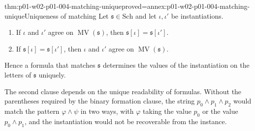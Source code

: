 \begin{hbtheorem}{thm:p01-w02-p01-004-matching-unique}{proved=annex:p01-w02-p01-004-matching-unique}{Uniqueness of matching}
Let \(\mathfrak s\in\mathrm{Sch}\) and let \(\iota,\iota'\) be
instantiations.
\begin{enumerate}
  \item If \(\iota\) and \(\iota'\) agree on \(\operatorname{MV}(\mathfrak
        s)\), then \(\mathfrak s[\iota]=\mathfrak s[\iota']\).
  \item If \(\mathfrak s[\iota]=\mathfrak s[\iota']\), then \(\iota\) and
        \(\iota'\) agree on \(\operatorname{MV}(\mathfrak s)\).
\end{enumerate}
Hence a formula that matches \(\mathfrak s\) determines the values of the
instantiation on the letters of \(\mathfrak s\) uniquely.
\end{hbtheorem}

The second clause depends on the unique readability of formulas. Without the
parentheses required by the binary formation clause, the string
\(p_0\land p_1\land p_2\) would match the pattern
\(\varphi\land\psi\) in two ways, with \(\varphi\) taking the value
\(p_0\) or the value \(p_0\land p_1\), and the instantiation would not be
recoverable from the instance.

